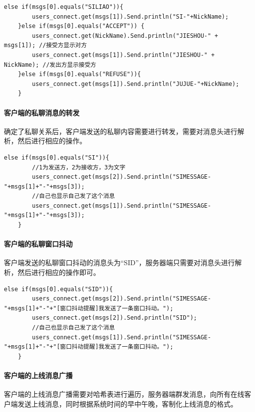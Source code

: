 \documentclass[UTF8,12pt]{article}
\begin{document}
\begin{lstlisting}[title=客户端的私聊请求,frame=shadowbox]
    else if(msgs[0].equals("SILIAO")){
        users_connect.get(msgs[1]).Send.println("SI-"+NickName);
    }else if(msgs[0].equals("ACCEPT")) {
        users_connect.get(NickName).Send.println("JIESHOU-" + msgs[1]); //接受方显示对方
        users_connect.get(msgs[1]).Send.println("JIESHOU-" + NickName); //发出方显示接受方
    }else if(msgs[0].equals("REFUSE")){
        users_connect.get(msgs[1]).Send.println("JUJUE-"+NickName);
    }
\end{lstlisting}

\paragraph{客户端的私聊消息的转发}
确定了私聊关系后，客户端发送的私聊内容需要进行转发，需要对消息头进行解析，然后进行相应的操作。

\begin{lstlisting}[title=客户端的私聊消息的转发,frame=shadowbox]
    else if(msgs[0].equals("SI")){
        //1为发送方，2为接收方，3为文字
        users_connect.get(msgs[2]).Send.println("SIMESSAGE-"+msgs[1]+"-"+msgs[3]);
        //自己也显示自己发了这个消息
        users_connect.get(msgs[1]).Send.println("SIMESSAGE-"+msgs[1]+"-"+msgs[3]);
    }
\end{lstlisting}

\paragraph{客户端的私聊窗口抖动}
客户端发送的私聊窗口抖动的消息头为“SID”，服务器端只需要对消息头进行解析，然后进行相应的操作即可。

\begin{lstlisting}[title=客户端的私聊窗口抖动,frame=shadowbox]
    else if(msgs[0].equals("SID")){
        users_connect.get(msgs[2]).Send.println("SIMESSAGE-"+msgs[1]+"-"+"[窗口抖动提醒]我发送了一条窗口抖动。");
        users_connect.get(msgs[2]).Send.println("SID");
        //自己也显示自己发了这个消息
        users_connect.get(msgs[1]).Send.println("SIMESSAGE-"+msgs[1]+"-"+"[窗口抖动提醒]我发送了一条窗口抖动。");
    }
\end{lstlisting}

\paragraph{客户端的上线消息广播}
客户端的上线消息广播需要对哈希表进行遍历，服务器端群发消息，向所有在线客户端发送上线消息，同时根据系统时间的早中午晚，客制化上线消息的格式。
\end{document}
